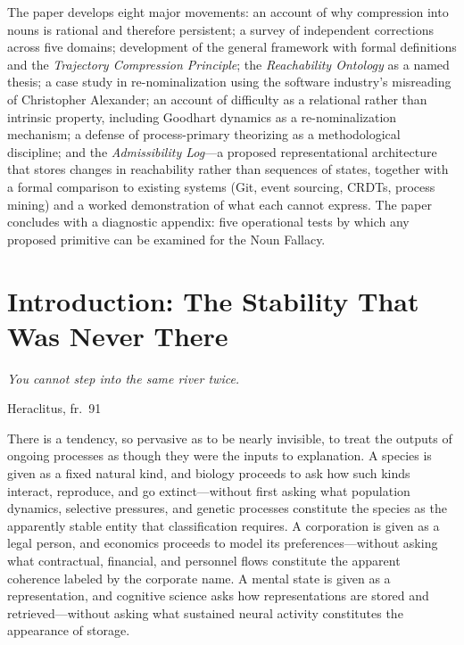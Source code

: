 \documentclass[12pt, a4paper]{article}
\theoremstyle{plain}
\theoremstyle{definition}
\theoremstyle{remark}
\begin{document}
The paper develops eight major movements: an account of why compression
into nouns is rational and therefore persistent; a survey of independent
corrections across five domains; development of the general framework with
formal definitions and the \emph{Trajectory Compression Principle}; the
\emph{Reachability Ontology} as a named thesis; a case study in
re-nominalization using the software industry's misreading of Christopher
Alexander; an account of difficulty as a relational rather than intrinsic
property, including Goodhart dynamics as a re-nominalization mechanism;
a defense of process-primary theorizing as a methodological discipline;
and the \emph{Admissibility Log}---a proposed representational architecture
that stores changes in reachability rather than sequences of states, together
with a formal comparison to existing systems (Git, event sourcing, CRDTs,
process mining) and a worked demonstration of what each cannot express.
The paper concludes with a diagnostic appendix: five operational tests by
which any proposed primitive can be examined for the Noun Fallacy.

\newpage

\tableofcontents
\newpage

\section{Introduction: The Stability That Was Never There}

\epigraph{\textit{You cannot step into the same river twice.}}{Heraclitus, fr.\ 91}

\noindent
There is a tendency, so pervasive as to be nearly invisible, to treat the
outputs of ongoing processes as though they were the inputs to explanation.
A species is given as a fixed natural kind, and biology proceeds to ask how
such kinds interact, reproduce, and go extinct---without first asking what
population dynamics, selective pressures, and genetic processes constitute
the species as the apparently stable entity that classification requires.
A corporation is given as a legal person, and economics proceeds to model
its preferences---without asking what contractual, financial, and personnel
flows constitute the apparent coherence labeled by the corporate name.
A mental state is given as a representation, and cognitive science asks how
representations are stored and retrieved---without asking what sustained
neural activity constitutes the appearance of storage.
\end{document}
